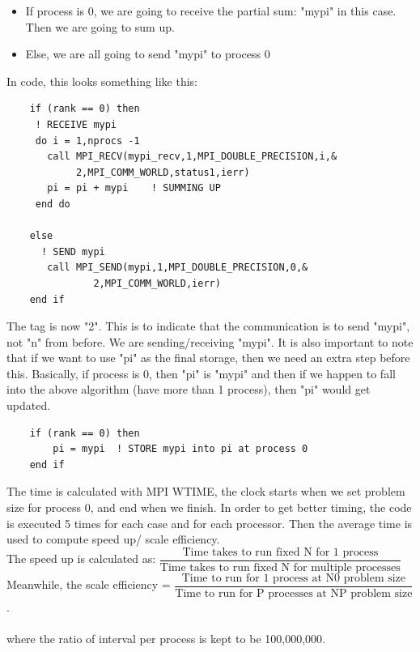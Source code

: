 \documentclass[12pt]{article}
\begin{document}
	\begin{itemize}
		\item If process is 0, we are going to receive the partial sum: "mypi" in this case. Then we are going to sum up. 
		\item Else, we are all going to send "mypi" to process 0 
	\end{itemize}
	\noindent
	In code, this looks something like this: 

	\begin{lstlisting}
	if (rank == 0) then 
	 ! RECEIVE mypi
	 do i = 1,nprocs -1  
	   call MPI_RECV(mypi_recv,1,MPI_DOUBLE_PRECISION,i,&
			2,MPI_COMM_WORLD,status1,ierr)
	   pi = pi + mypi    ! SUMMING UP
	 end do

	else
	  ! SEND mypi
	   call MPI_SEND(mypi,1,MPI_DOUBLE_PRECISION,0,&
			   2,MPI_COMM_WORLD,ierr)
	end if 
	\end{lstlisting}

	\noindent
	The tag is now "2".  This is to indicate that the communication is to send "mypi", not "n" from before. We are sending/receiving "mypi".  It is also important to note that if we want to use "pi" as the final storage, then we need an extra step before this.  Basically, if process is 0, then "pi" is "mypi" and then if we happen to fall into the above algorithm (have more than 1 process), then "pi" would get updated.  

	\begin{lstlisting}
	if (rank == 0) then 
		pi = mypi  ! STORE mypi into pi at process 0
	end if     
	\end{lstlisting}
	\noindent
	The time is calculated with MPI WTIME, the clock starts when we set problem size for process 0, and end when we finish.  In order to get better timing, the code is executed 5 times for each case and for each processor.  Then the average time is used to compute speed up/ scale efficiency. \\
	\noindent
	The speed up is calculated as:  $ \dfrac{\textrm{Time takes to run fixed N for 1 process}}{\textrm{Time takes to  run fixed N for multiple processes}}$
	\newline
	\newline
	\newline
	\noindent
	Meanwhile, the scale efficiency = $\dfrac{\textrm{Time to run for 1 process at N0 problem size}}{\textrm{Time to run for P processes at NP problem size}}$.\\ \\
	\noindent
	where the ratio of interval per process is kept to be 100,000,000. 
\end{document}
